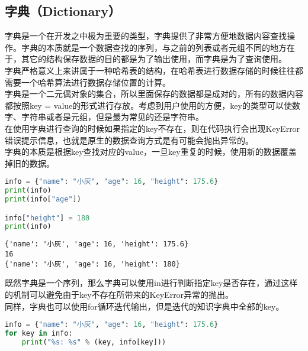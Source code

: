 \subsection{字典（Dictionary）}

字典是一个在开发之中极为重要的类型，字典提供了非常方便地数据内容查找操作。字典的本质就是一个数据查找的序列，与之前的列表或者元组不同的地方在于，其它的结构保存数据的目的都是为了输出使用，而字典是为了查询使用。\\

字典严格意义上来讲属于一种哈希表的结构，在哈希表进行数据存储的时候往往都需要一个哈希算法进行数据存储位置的计算。\\

字典是一个二元偶对象的集合，所以里面保存的数据都是成对的，所有的数据内容都按照key = value的形式进行存放。考虑到用户使用的方便，key的类型可以使数字、字符串或者是元组，但是最为常见的还是字符串。\\

在使用字典进行查询的时候如果指定的key不存在，则在代码执行会出现KeyError错误提示信息，也就是原生的数据查询方式是有可能会抛出异常的。\\

字典的本质是根据key查找对应的value，一旦key重复的时候，使用新的数据覆盖掉旧的数据。\\


\begin{lstlisting}[language=Python]
info = {"name": "小灰", "age": 16, "height": 175.6}
print(info)
print(info["age"])

info["height"] = 180
print(info)
\end{lstlisting}

\begin{tcolorbox}
	\begin{verbatim}
{'name': '小灰', 'age': 16, 'height': 175.6}
16
{'name': '小灰', 'age': 16, 'height': 180}
\end{verbatim}
\end{tcolorbox}

既然字典是一个序列，那么字典可以使用in进行判断指定key是否存在，通过这样的机制可以避免由于key不存在所带来的KeyError异常的抛出。\\


同样，字典也可以使用for循环迭代输出，但是迭代的知识字典中全部的key。\\


\begin{lstlisting}[language=Python]
info = {"name": "小灰", "age": 16, "height": 175.6}
for key in info:
    print("%s: %s" % (key, info[key]))
\end{lstlisting}

